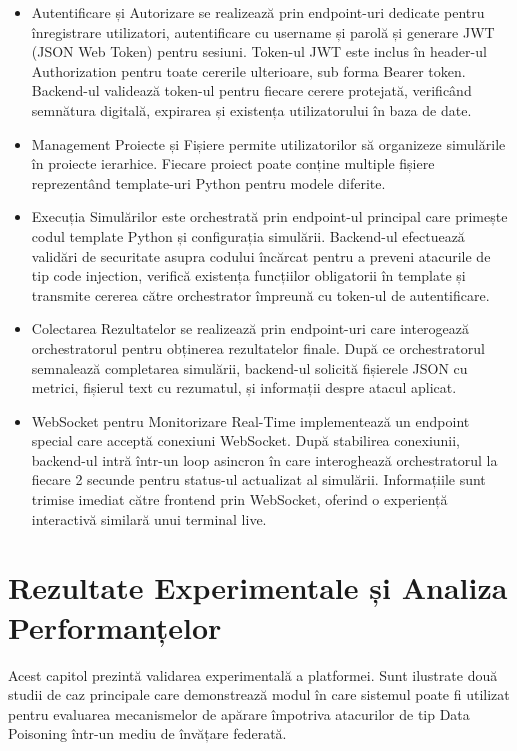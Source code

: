 \documentclass[../../main.tex]{subfiles}
\begin{document}
    \begin{itemize}
	        \item Autentificare și Autorizare se realizează prin endpoint-uri dedicate pentru înregistrare utilizatori, autentificare cu username și parolă și generare JWT (JSON Web Token) pentru sesiuni. Token-ul JWT este inclus în header-ul Authorization pentru toate cererile ulterioare, sub forma Bearer token. Backend-ul validează token-ul pentru fiecare cerere protejată, verificând semnătura digitală, expirarea și existența utilizatorului în baza de date.
        \item Management Proiecte și Fișiere permite utilizatorilor să organizeze simulările în proiecte ierarhice. Fiecare proiect poate conține multiple fișiere reprezentând template-uri Python pentru modele diferite.
	        \item Execuția Simulărilor este orchestrată prin endpoint-ul principal care primeș\-te codul template Python și configurația simulării. Backend-ul efectuează validări de securitate asupra codului încărcat pentru a preveni atacurile de tip code injection, verifică existența funcțiilor obligatorii în template și transmite cererea către orchestrator împreună cu token-ul de autentificare.
        \item Colectarea Rezultatelor se realizează prin endpoint-uri care interogează orchestratorul pentru obținerea rezultatelor finale. După ce orchestratorul semnalează completarea simulării, backend-ul solicită fișierele JSON cu metrici, fișierul text cu rezumatul, și informa\-ții despre atacul aplicat.
        \item WebSocket pentru Monitorizare Real-Time implementează un endpoint special care acceptă conexiuni WebSocket. După stabilirea conexiunii, backend-ul intră într-un loop asincron în care interoghează orchestratorul la fiecare 2 secunde pentru status-ul actualizat al simulării. Informațiile sunt trimise imediat către frontend prin WebSocket, oferind o experiență interactivă similară unui terminal live.

    \end{itemize}

\chapter{Rezultate Experimentale și Analiza Performanțelor}

    Acest capitol prezintă validarea experimentală a platformei. Sunt ilustrate două studii de caz principale care demonstrează modul în care sistemul poate fi utilizat pentru evaluarea mecanismelor de apărare împotriva atacurilor de tip Data Poisoning într-un mediu de învățare federată.
\end{document}
